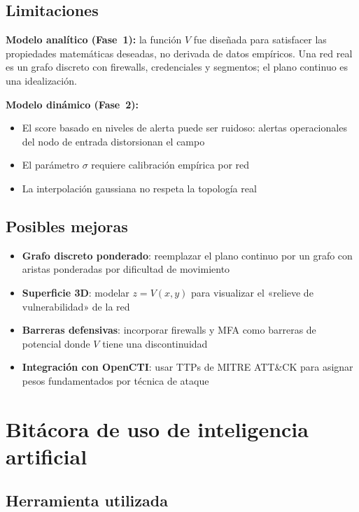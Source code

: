 \documentclass[12pt,a4paper]{article}
\begin{document}
\subsection{Limitaciones}

\textbf{Modelo analítico (Fase~1):} la función $V$ fue diseñada para
satisfacer las propiedades matemáticas deseadas, no derivada de datos
empíricos. Una red real es un grafo discreto con firewalls, credenciales
y segmentos; el plano continuo es una idealización.

\textbf{Modelo dinámico (Fase~2):}
\begin{itemize}
  \item El score basado en niveles de alerta puede ser ruidoso: alertas
    operacionales del nodo de entrada distorsionan el campo
  \item El parámetro $\sigma$ requiere calibración empírica por red
  \item La interpolación gaussiana no respeta la topología real
\end{itemize}

\subsection{Posibles mejoras}

\begin{itemize}
  \item \textbf{Grafo discreto ponderado}: reemplazar el plano continuo
    por un grafo con aristas ponderadas por dificultad de movimiento
  \item \textbf{Superficie 3D}: modelar $z = V(x,y)$ para visualizar
    el «relieve de vulnerabilidad» de la red
  \item \textbf{Barreras defensivas}: incorporar firewalls y MFA como
    barreras de potencial donde $V$ tiene una discontinuidad
  \item \textbf{Integración con OpenCTI}: usar TTPs de MITRE ATT\&CK
    para asignar pesos fundamentados por técnica de ataque
\end{itemize}

\section{Bitácora de uso de inteligencia artificial}

\subsection*{Herramienta utilizada}
\end{document}

